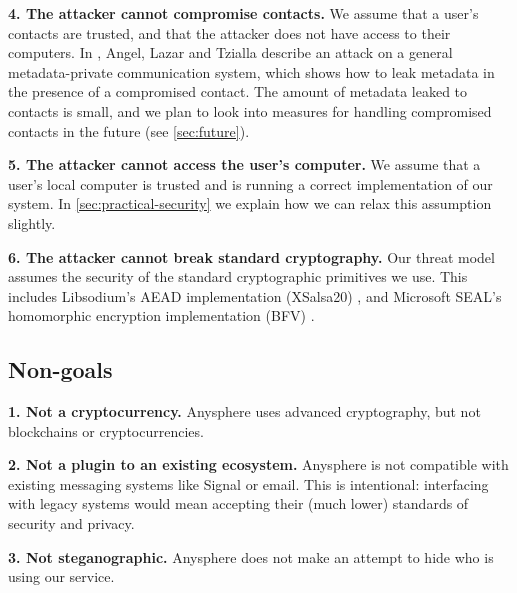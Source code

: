 \textbf{4. The attacker cannot compromise contacts.} We assume that a user's contacts are trusted, and that the attacker does not have access to their computers. In \cite{angel2018s}, Angel, Lazar and Tzialla describe an attack on a general metadata-private communication system, which shows how to leak metadata in the presence of a compromised contact. The amount of metadata leaked to contacts is small, and we plan to look into measures for handling compromised contacts in the future (see \cref{sec:future}).

\textbf{5. The attacker cannot access the user's computer.} We assume that a user's local computer is trusted and is running a correct implementation of our system. In \cref{sec:practical-security} we explain how we can relax this assumption slightly.

\textbf{6. The attacker cannot break standard cryptography.} Our threat model assumes the security of the standard cryptographic primitives we use. This includes Libsodium's AEAD implementation (XSalsa20) \cite{libsodium}, and Microsoft SEAL's homomorphic encryption implementation (BFV) \cite{sealcrypto}.

\subsection{Non-goals}
\textbf{1. Not a cryptocurrency.} Anysphere uses advanced cryptography, but not blockchains or cryptocurrencies.

\textbf{2. Not a plugin to an existing ecosystem.} Anysphere is not compatible with existing messaging systems like Signal or email. This is intentional: interfacing with legacy systems would mean accepting their (much lower) standards of security and privacy.

\textbf{3. Not steganographic.} Anysphere does not make an attempt to hide who is using our service.

